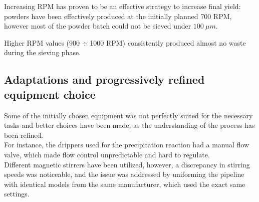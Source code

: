 \documentclass{article}
\begin{document}
        Increasing RPM has proven to be an effective 
        strategy to increase final yield: powders have been effectively produced at the initially planned 700 RPM, however 
        most of the powder batch could not be sieved under $100 \ \mu m$. 

        Higher RPM values (900 $\div $ 1000 RPM) consistently produced almost no waste during the sieving phase. 


        \subsection{Adaptations and progressively refined equipment choice\label{faulty_equipment}}

        Some of the initially chosen equipment was not perfectly suited for the necessary tasks and better choices have been made, as the 
        understanding of the process has been refined. \\ 

        For instance, the drippers used for the precipitation reaction had a manual flow valve, which made flow control unpredictable 
        and hard to regulate. \\ 

%

        Different magnetic stirrers have been utilized, however, a discrepancy 
        in stirring speeds was noticeable, and the issue was addressed by uniforming the pipeline with identical models from the same manufacturer, 
        which used the exact same settings. 


%
\end{document}
